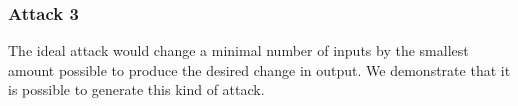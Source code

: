 \subsubsection{Attack 3}
The ideal attack would change a minimal number of inputs by the smallest amount possible to produce the desired change in output. 
We demonstrate that it is possible to generate this kind of attack.
 
















